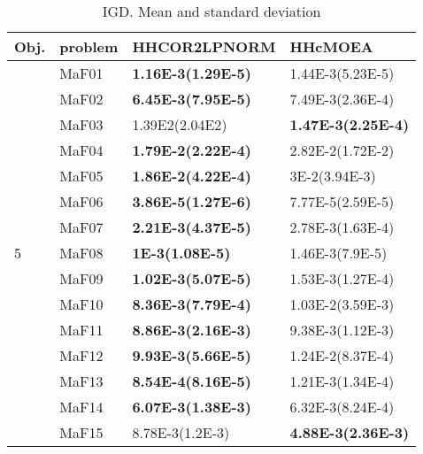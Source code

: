 \documentclass[]{article}
\begin{document}
\begin{table}
\caption{IGD. Mean and standard deviation}
\label{table:mean.IGD}
\centering
\begin{footnotesize}
\begin{tabular}{|l|l|l|l|}
\hline
Obj. & problem  & HHCOR2LPNORM & HHcMOEA \\ \hline

\multirow{15}{*}{5} & MaF01 & \cellcolor{gray95} {\bf 1.16E-3(1.29E-5)} & 1.44E-3(5.23E-5)\\
 & MaF02 & \cellcolor{gray95} {\bf 6.45E-3(7.95E-5)} & 7.49E-3(2.36E-4)\\
 & MaF03 & 1.39E2(2.04E2) & \cellcolor{gray95} {\bf 1.47E-3(2.25E-4)}\\
 & MaF04 & \cellcolor{gray95} {\bf 1.79E-2(2.22E-4)} & 2.82E-2(1.72E-2)\\
 & MaF05 & \cellcolor{gray95} {\bf 1.86E-2(4.22E-4)} & 3E-2(3.94E-3)\\
 & MaF06 & \cellcolor{gray95} {\bf 3.86E-5(1.27E-6)} & 7.77E-5(2.59E-5)\\
 & MaF07 & \cellcolor{gray95} {\bf 2.21E-3(4.37E-5)} & 2.78E-3(1.63E-4)\\
 & MaF08 & \cellcolor{gray95} {\bf 1E-3(1.08E-5)} & 1.46E-3(7.9E-5)\\
 & MaF09 & \cellcolor{gray95} {\bf 1.02E-3(5.07E-5)} & 1.53E-3(1.27E-4)\\
 & MaF10 & \cellcolor{gray95} {\bf 8.36E-3(7.79E-4)} & \cellcolor{gray95} 1.03E-2(3.59E-3)\\
 & MaF11 & \cellcolor{gray95} {\bf 8.86E-3(2.16E-3)} & 9.38E-3(1.12E-3)\\
 & MaF12 & \cellcolor{gray95} {\bf 9.93E-3(5.66E-5)} & 1.24E-2(8.37E-4)\\
 & MaF13 & \cellcolor{gray95} {\bf 8.54E-4(8.16E-5)} & 1.21E-3(1.34E-4)\\
 & MaF14 & \cellcolor{gray95} {\bf 6.07E-3(1.38E-3)} & \cellcolor{gray95} 6.32E-3(8.24E-4)\\
 & MaF15 & 8.78E-3(1.2E-3) & \cellcolor{gray95} {\bf 4.88E-3(2.36E-3)}\\
\hline


\end{tabular}
\end{footnotesize}
\end{table}
\end{document}
